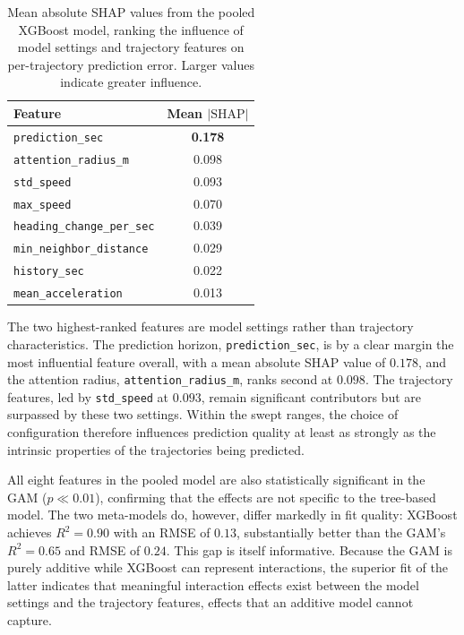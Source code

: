 \documentclass[12pt]{article}
\begin{document}
\begin{table}[h]
  \centering
  \caption[Pooled-model mean absolute SHAP values]{Mean absolute SHAP values from the pooled XGBoost model, ranking the influence of model settings and trajectory features on per-trajectory prediction error. Larger values indicate greater influence.}
  \label{tab:settings_shap}
  \begin{tabular}{l c}
    \toprule
    \textbf{Feature} & \textbf{Mean} $|\text{SHAP}|$ \\
    \midrule
    \texttt{prediction\_sec}        & \textbf{0.178} \\
    \texttt{attention\_radius\_m}   & 0.098 \\
    \texttt{std\_speed}             & 0.093 \\
    \texttt{max\_speed}             & 0.070 \\
    \texttt{heading\_change\_per\_sec} & 0.039 \\
    \texttt{min\_neighbor\_distance}   & 0.029 \\
    \texttt{history\_sec}           & 0.022 \\
    \texttt{mean\_acceleration}     & 0.013 \\
    \bottomrule
  \end{tabular}
\end{table}

The two highest-ranked features are model settings rather than trajectory characteristics. The prediction horizon, \texttt{prediction\_sec}, is by a clear margin the most influential feature overall, with a mean absolute SHAP value of $0.178$, and the attention radius, \texttt{attention\_radius\_m}, ranks second at $0.098$. The trajectory features, led by \texttt{std\_speed} at $0.093$, remain significant contributors but are surpassed by these two settings. Within the swept ranges, the choice of configuration therefore influences prediction quality at least as strongly as the intrinsic properties of the trajectories being predicted.

All eight features in the pooled model are also statistically significant in the GAM ($p \ll 0.01$), confirming that the effects are not specific to the tree-based model. The two meta-models do, however, differ markedly in fit quality: XGBoost achieves $R^2 = 0.90$ with an RMSE of $0.13$, substantially better than the GAM's $R^2 = 0.65$ and RMSE of $0.24$. This gap is itself informative. Because the GAM is purely additive while XGBoost can represent interactions, the superior fit of the latter indicates that meaningful interaction effects exist between the model settings and the trajectory features, effects that an additive model cannot capture.
\end{document}
